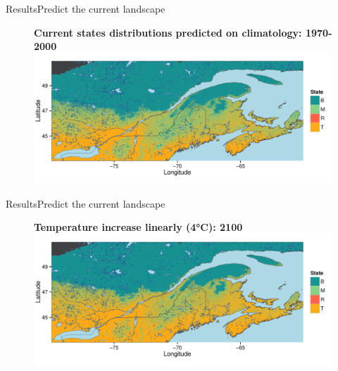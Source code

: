 \documentclass[10pt,aspectratio=149]{beamer}
\begin{document}

\begin{frame}[t]{Results}{Predict the current landscape}

		\begin{figure}
			\centering\textbf{Current states distributions predicted on climatology: 1970-2000}
			\includegraphics[width=0.9\paperwidth]{Figs/338_500ts_final_land.pdf}
		\end{figure}


\end{frame}



\begin{frame}[t]{Results}{Predict the current landscape}

		\begin{figure}
			\centering\textbf{Temperature increase linearly (4°C): 2100}
			\includegraphics[width=0.9\paperwidth]{Figs/338_withcc_final_land.pdf}
		\end{figure}

\end{frame}
\end{document}
